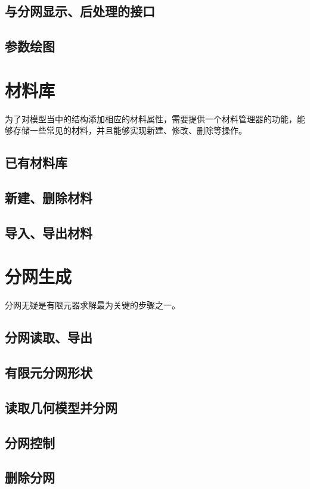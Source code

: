 \subsection{与分网显示、后处理的接口}

\subsection{参数绘图}

\section{材料库}
为了对模型当中的结构添加相应的材料属性，需要提供一个材料管理器的功能，能够存储一些常见的材料，并且能够实现新建、修改、删除等操作。
\subsection{已有材料库}

\subsection{新建、删除材料}

\subsection{导入、导出材料}

\section{分网生成}
分网无疑是有限元器求解最为关键的步骤之一。
\subsection{分网读取、导出}

\subsection{有限元分网形状}

\subsection{读取几何模型并分网}

\subsection{分网控制}

\subsection{删除分网}

